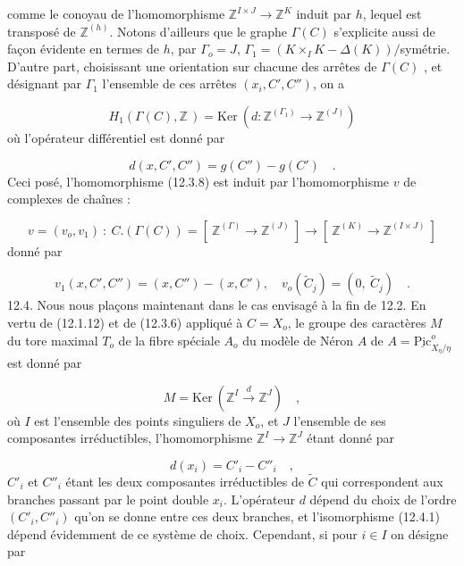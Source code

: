 comme le conoyau de l'homomorphisme $\mathbb{Z}^{I \times J} \longrightarrow \mathbb{Z}^{K}$ induit par $h$, lequel est transposé de $\mathbb{Z}^{(h)}$. Notons d'ailleurs que le graphe $\Gamma(C)$ s'explicite aussi de façon évidente en termes de $h$, par $\Gamma_o = J$, $\Gamma_1 = (K \times_I K - \Delta(K))/$symétrie. D'autre part, choisissant une orientation sur chacune des arrêtes de $\Gamma(C)$ , et désignant par $\Gamma_1$ l'ensemble de ces arrêtes $(x_i,C',C'')$, on a

\begin{equation}\tag{12.3.11}
H_1(\Gamma(C),\mathbb{Z}\,) = \mathrm{Ker}\ (d : \mathbb{Z}^{(\Gamma_1)} \longrightarrow \mathbb{Z}^{(J)})
\end{equation}
où l'opérateur différentiel est donné par

\begin{equation}\tag{12.3.12}
d(x,C',C'') = g(C'') - g(C') \quad .
\end{equation}
Ceci posé, l'homomorphisme (12.3.8) est induit par l'homomorphisme $v$ de complexes de chaînes :

\begin{equation}\tag{12.3.13}
v = (v_o,v_1) \ : \ C.(\Gamma(C)) = \left[\ \mathbb{Z}^{(\Gamma)} \longrightarrow \mathbb{Z}^{(J)}\ \right] \to \left[\ \mathbb{Z}^{(K)} \to \mathbb{Z}^{(I \times J)}\ \right]
\end{equation}
donné par

\begin{equation}\tag{12.3.14}
v_1(x,C',C'') = (x,C'') - (x,C'), \quad v_o(\widetilde{C}_j) = (0,\ \widetilde{C}_j) \quad .
\end{equation}
12.4. Nous nous plaçons maintenant dans le cas envisagé à la fin de 12.2. En vertu de (12.1.12) et de (12.3.6) appliqué à $C = X_o$, le groupe des caractères $M$ du tore maximal $T_o$ de la fibre spéciale $A_o$ du modèle de Néron $A$ de $A = \underline{\mathrm{Pic}}^{o}_{X_\eta/\eta}$ est donné par

\begin{equation}\tag{12.4.1}
M = \mathrm{Ker}\ (\mathbb{Z}^{I} \xrightarrow{\ d\ } \mathbb{Z}^{J}) \quad ,
\end{equation}
où $I$ est l'ensemble des points singuliers de $X_o$, et $J$ l'ensemble de ses composantes irréductibles, l'homomorphisme $\mathbb{Z}^{I} \longrightarrow \mathbb{Z}^{J}$ étant donné par



\begin{equation}\tag{12.4.2}
d(x_i) = C'_i - C''_i \quad ,
\end{equation}
$C'_i$ et $C''_i$ étant les deux composantes irréductibles de $\widetilde{C}$ qui correspondent aux branches passant par le point double $x_i$. L'opérateur $d$ dépend du choix de l'ordre $(C'_i,C''_i)$ qu'on se donne entre ces deux branches, et l'isomorphisme (12.4.1) dépend évidemment de ce système de choix. Cependant, si pour $i \in I$ on désigne par

